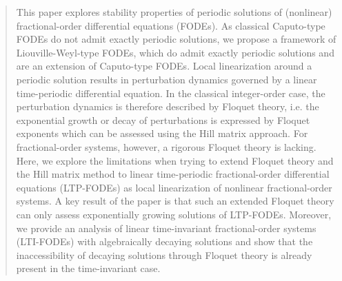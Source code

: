 \documentclass{svproc}
\begin{document}
	\begin{abstract}{This paper explores stability properties of {periodic solutions of} (nonlinear) fractional-order differential equations (FODEs). { As classical Caputo-type FODEs do not admit exactly periodic solutions, we propose a framework of Liouville-Weyl-type FODEs, which do admit exactly periodic solutions and are an extension of Caputo-type FODEs. }Local linearization around a periodic solution results in perturbation dynamics governed by a linear time-periodic differential equation. In the classical integer-order case, the perturbation dynamics is therefore described by Floquet theory, i.e. the exponential growth or decay of perturbations is expressed by Floquet exponents which can be assessed using the Hill matrix approach. For fractional-order systems, however, a rigorous Floquet theory is lacking. Here, we explore the { limitations} when trying  to extend Floquet theory and the Hill matrix method to linear time-periodic fractional-order differential equations (LTP-FODEs) as local linearization of nonlinear fractional-order systems. A key result of the paper is that such an extended Floquet theory can only assess exponentially growing solutions of LTP-FODEs. Moreover, we provide an analysis of linear time-invariant fractional-order systems (LTI-FODEs) with algebraically decaying solutions and show that the inaccessibility of decaying solutions through Floquet theory is already present in the time-invariant case.
}
	\end{abstract}
	{}
\end{document}
